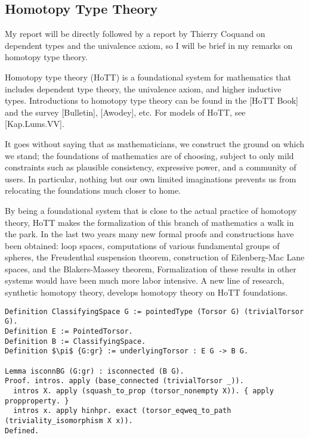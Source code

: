 \documentclass[brochure,english,12pt]{bourbaki}
\theoremstyle{plain}
\begin{document}
\subsection{Homotopy Type Theory}

My report will be directly followed by a report by Thierry Coquand on dependent types and
the univalence axiom, so I will be brief in my remarks on homotopy type theory.

Homotopy type theory (HoTT) is a foundational system for mathematics that includes
dependent type theory, the univalence axiom, and higher inductive types.  
Introductions to homotopy type theory can be found in the [HoTT Book] and the survey [Bulletin], [Awodey], etc.
For models of HoTT, see [Kap.Lums.VV].

It goes without saying that as mathematicians, we construct the ground on which we stand;
the foundations of mathematics are of choosing, subject
to only mild constraints such as plausible consistency, expressive power, and a community of users.
In particular, nothing but our own limited imaginations prevents us from relocating the
foundations much closer to home.

By being a foundational system that is close to the actual practice of homotopy theory,
HoTT makes the formalization of this branch of mathematics a walk in the park.
In the last two years many new formal proofs and constructions have been obtained: 
loop spaces, computations of various
fundamental groups of spheres, the Freudenthal suspension theorem,
construction of Eilenberg-Mac Lane spaces, and the Blakers-Massey theorem,
Formalization of these results in other systems would have been much more labor intensive.
A new line of research, synthetic homotopy theory, develops homotopy theory on HoTT foundations.

\begin{lstlisting}[keepspaces=true,stringstyle=\tt,basicstyle=\small,frame=single,framesep=8pt,mathescape,morekeywords={Definition,Lemma,Proof,Defined},columns=flexible,caption={Construction of classifying spaces as the type of a torsor in Univalent foundations.  The proof that the classifying space $BG$ is connected. --D. Grayson.}]
Definition ClassifyingSpace G := pointedType (Torsor G) (trivialTorsor G).
Definition E := PointedTorsor.
Definition B := ClassifyingSpace.
Definition $\pi$ {G:gr} := underlyingTorsor : E G -> B G.

Lemma isconnBG (G:gr) : isconnected (B G).
Proof. intros. apply (base_connected (trivialTorsor _)).
  intros X. apply (squash_to_prop (torsor_nonempty X)). { apply propproperty. }
  intros x. apply hinhpr. exact (torsor_eqweq_to_path (triviality_isomorphism X x)). 
Defined.
\end{lstlisting}
\end{document}
